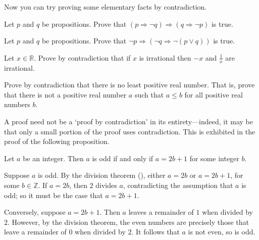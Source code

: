 Now you can try proving some elementary facts by contradiction.

\begin{exercise}
Let $p$ and $q$ be propositions. Prove that $(p \Rightarrow \neg q) \Rightarrow (q \Rightarrow \neg p)$ is true.

\end{exercise}

\begin{exercise}
Let $p$ and $q$ be propositions. Prove that $\neg p \Rightarrow (\neg q \Rightarrow \neg(p \vee q))$ is true.

\end{exercise}

\begin{exercise}
\label{exNegationAndReciprocalOfIrrationalNumbers}
Let $x \in \mathbb{R}$. Prove by contradiction that if $x$ is irrational then $-x$ and $\frac{1}{x}$ are irrational.
\end{exercise}

\begin{exercise}
\label{exNoLeastPositiveReal}
Prove by contradiction that there is no least positive real number. That is, prove that there is not a positive real number $a$ such that $a \le b$ for all positive real numbers $b$.
\end{exercise}

A proof need not be a `proof by contradiction' in its entirety---indeed, it may be that only a small portion of the proof uses contradiction. This is exhibited in the proof of the following proposition.

\begin{proposition}
\label{propOddIffRemainderOfOne}
Let $a$ be an integer. Then $a$ is odd if and only if $a=2b+1$ for some integer $b$.
\end{proposition}
\begin{cproof}
Suppose $a$ is odd. By the division theorem (), either $a=2b$ or $a=2b+1$, for some $b \in \mathbb{Z}$. If $a=2b$, then $2$ divides $a$, contradicting the assumption that $a$ is odd; so it must be the case that $a=2b+1$.

Conversely, suppose $a=2b+1$. Then $a$ leaves a remainder of $1$ when divided by $2$. However, by the division theorem, the even numbers are precisely those that leave a remainder of $0$ when divided by $2$. It follows that $a$ is not even, so is odd.
\end{cproof}

